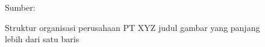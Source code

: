 \begin{figure}
	\centering
	\caption{Struktur organisasi perusahaan PT XYZ judul gambar yang panjang lebih dari satu baris}
	\vspace{-1em}
	{\small Sumber: \cite{Widjaja2002a}}
	\label{fig_struktur_organisasi}
\end{figure}


